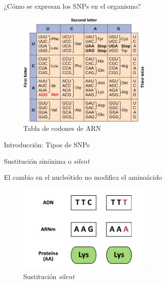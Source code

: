 \documentclass[
  spanish,
  ignorenonframetext,
]{beamer}
\begin{document}
\begin{frame}{¿Cómo se expresan los SNPs en el organismo?}
\protect\hypertarget{cuxf3mo-se-expresan-los-snps-en-el-organismo}{}

\begin{figure}
\centering
\includegraphics[width=2.60417in,height=\textheight]{tableCodon.jpg}
\caption{Tabla de codones de ARN}
\end{figure}

\end{frame}

\begin{frame}{Introducción: Tipos de SNPs}
\protect\hypertarget{introducciuxf3n-tipos-de-snps}{}

\begin{block}{Sustitución sinónima o \textit{silent}}

El cambio en el nucleótido no modifica el aminoácido

\end{block}

\begin{figure}
\centering
\includegraphics[width=2.60417in,height=\textheight]{silent_mutation.pdf}
\caption{Sustitución \textit{silent}}
\end{figure}

\end{frame}
\end{document}

